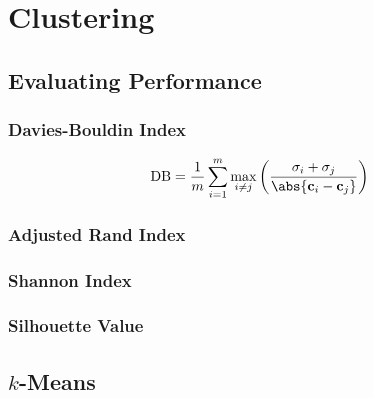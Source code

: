 \chapter{Clustering}
\label{chap:cluster}

\section{Evaluating Performance}
\label{cluster:eval}

\subsection{Davies-Bouldin Index}
\label{cluster:eval:davies_bouldin}

\begin{equation} \label{eq:davies_bouldin}
\text{DB} = \frac{1}{m} \sum_{i=1}^{m} \max_{i \neq j} \left(\frac{\sigma_{i} + \sigma_{j}}{\abs{\mathbf{c}_{i} - \mathbf{c}_{j}}}\right)
\end{equation}

\subsection{Adjusted Rand Index}
\label{cluster:eval:adjusted_rand_index}

\subsection{Shannon Index}
\label{cluster:eval:shannon_index}

\subsection{Silhouette Value}
\label{cluster:eval:silhouette}

\section{\texorpdfstring{$k$}{k}-Means}
\label{cluster:kMean}

